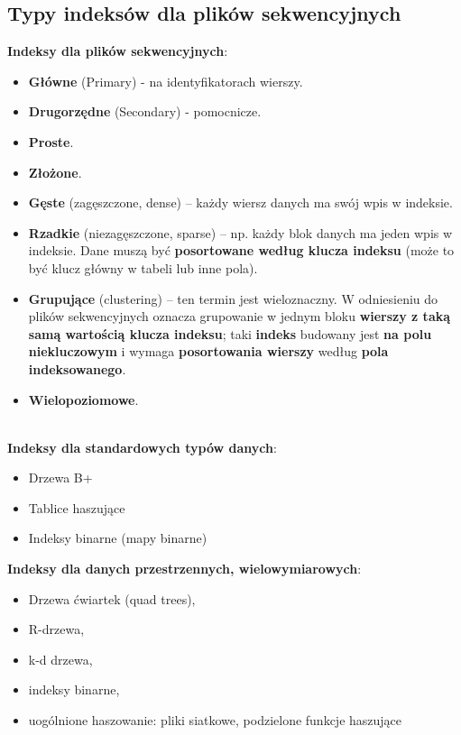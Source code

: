 \documentclass[a4paper]{article}
\begin{document}
\subsection{Typy indeksów dla plików sekwencyjnych}
\textbf{Indeksy dla plików sekwencyjnych}:
\begin{itemize}
    \item \textbf{Główne} (Primary) - na identyfikatorach wierszy.
    \item \textbf{Drugorzędne} (Secondary) - pomocnicze.\\
    
    \item \textbf{Proste}.
    \item \textbf{Złożone}.\\
    
    \item \textbf{Gęste} (zagęszczone, dense) – każdy wiersz danych ma swój wpis w indeksie.
    \item \textbf{Rzadkie} (niezagęszczone, sparse) – np. każdy blok danych ma jeden wpis w indeksie. Dane muszą być \textbf{posortowane według klucza indeksu} (może to być klucz główny w tabeli lub inne pola).\\
    
    \item \textbf{Grupujące} (clustering) – ten termin jest wieloznaczny. W odniesieniu do plików sekwencyjnych oznacza grupowanie w jednym bloku \textbf{wierszy z taką samą wartością klucza indeksu}; taki \textbf{indeks} budowany jest \textbf{na polu niekluczowym} i wymaga \textbf{posortowania wierszy} według \textbf{pola indeksowanego}.
    \item \textbf{Wielopoziomowe}.
\end{itemize}
\hfill \\
\textbf{Indeksy dla standardowych typów danych}:
\begin{itemize}
    \item Drzewa B+
    \item Tablice haszujące
    \item Indeksy binarne (mapy binarne)
\end{itemize}

\textbf{Indeksy dla danych przestrzennych, wielowymiarowych}:
\begin{itemize} 
\item Drzewa ćwiartek (quad trees), 
\item R-drzewa, 
\item k-d drzewa, 
\item indeksy binarne,
\item uogólnione haszowanie: pliki siatkowe, podzielone funkcje haszujące
\end{itemize}
\end{document}

